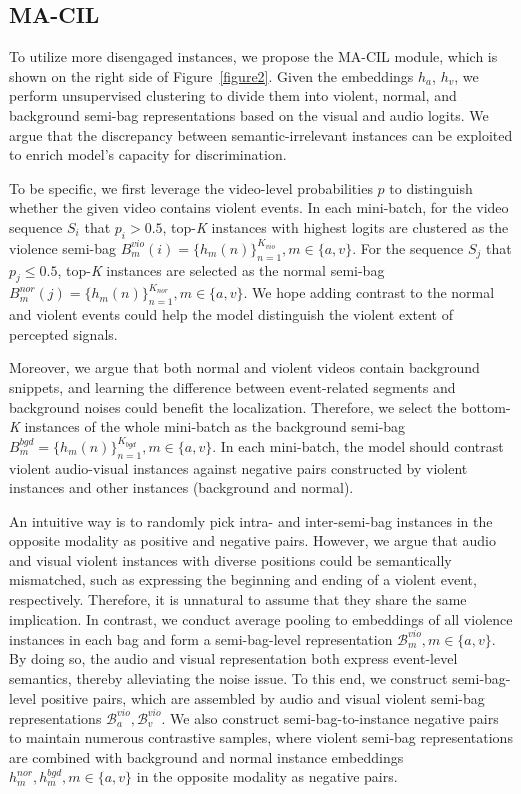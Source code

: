 \documentclass[sigconf]{acmart}
\begin{document}
\subsection{MA-CIL}

To utilize more disengaged instances, we propose the MA-CIL module, which is shown on the right side of Figure~\ref{figure2}. Given the embeddings $h_a$, $h_v$, we perform unsupervised clustering to divide them into violent, normal, and background semi-bag representations based on the visual and audio logits. We argue that the discrepancy between semantic-irrelevant instances can be exploited to enrich model's capacity for discrimination.

To be specific, we first leverage the video-level probabilities $p$ to distinguish whether the given video contains violent events. In each mini-batch, for the video sequence $S_i$ that $p_i > 0.5$, top-\textit{K} instances with highest logits are clustered as the violence semi-bag $B_m^{vio}(i) = \{h_m(n)\}_{n=1}^{K_{vio}}, m\in\{a, v\}$. For the sequence $S_j$ that $p_j \leq 0.5$, top-\textit{K} instances are selected as the normal semi-bag $B_m^{nor}(j) = \{h_m(n)\}_{n=1}^{K_{nor}}, m\in\{a, v\}$. We hope adding contrast to the normal and violent events could help the model distinguish the violent extent of percepted signals.

Moreover, we argue that both normal and violent videos contain background snippets, and learning the difference between event-related segments and background noises could benefit the localization. Therefore, we select the bottom-\textit{K} instances of the whole mini-batch as the background semi-bag $B_m^{bgd} = \{h_m(n)\}_{n=1}^{K_{bgd}}, m\in\{a, v\}$. In each mini-batch, the model should contrast violent audio-visual instances against negative pairs constructed by violent instances and other instances (background and normal).

An intuitive way is to randomly pick intra- and inter-semi-bag instances in the opposite modality as positive and negative pairs. However, we argue that audio and visual violent instances with diverse positions could be semantically mismatched, such as expressing the beginning and ending of a violent event, respectively. Therefore, it is unnatural to assume that they share the same implication. In contrast, we conduct average pooling to embeddings of all violence instances in each bag and form a semi-bag-level representation $\mathcal{B}_m^{vio}, m\in\{a, v\}$. By doing so, the audio and visual representation both express event-level semantics, thereby alleviating the noise issue. To this end, we construct semi-bag-level positive pairs, which are assembled by audio and visual violent semi-bag representations $\mathcal{B}_a^{vio}, \mathcal{B}_v^{vio}$. We also construct semi-bag-to-instance negative pairs to maintain numerous contrastive samples, where violent semi-bag representations are combined with background and normal instance embeddings $h_m^{nor}, h_m^{bgd}, m\in \{a, v\}$ in the opposite modality as negative pairs.
\end{document}
